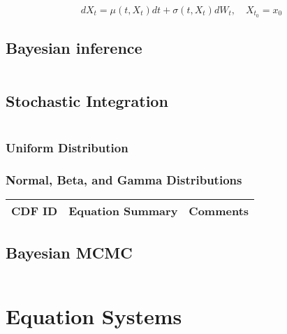 \begin{equation}\label{eds01}
dX_t = \mu(t,X_t) dt + \sigma(t,X_t) dW_t,\quad X_{t_{0}}=x_{0}
\end{equation}


\begin{enumerate}
\end{enumerate}

\subsection{Bayesian inference}

\begin{equation}
\end{equation}

\subsection{Stochastic Integration}

\begin{equation}
\end{equation}

\subsubsection{Uniform Distribution}

\subsubsection{Normal, Beta, and Gamma Distributions}

\begin{table}[H]\centering
	\begin{tabular}{p{1cm}p{6cm}p{2cm}}
		CDF ID & Equation Summary & Comments\\
		\hline
		\hline
	\end{tabular}
\end{table}

\subsection{Bayesian MCMC}

\begin{equation}
\end{equation}

\section{Equation Systems}

